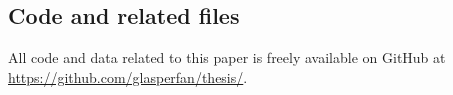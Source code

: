 \documentclass[11pt]{book}
\begin{document}
\subsection{Code and related files}

All code and data related to this paper is freely available on GitHub at\\ \url{https://github.com/glasperfan/thesis/}.

\newpage

\printbibliography
\end{document}
